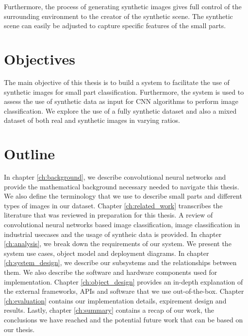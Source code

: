 Furthermore, the process of generating synthetic images gives full control of the surrounding environment to the creator of the synthetic scene. The synthetic scene can easily be adjusted to capture specific features of the small parts.

\section{Objectives}

The main objective of this thesis is to build a system to facilitate the use of synthetic images for small part classification. Furthermore, the system is used to assess the use of synthetic data as input for CNN algorithms to perform image classification. We explore the use of a fully synthetic dataset and also a mixed dataset of both real and synthetic images in varying ratios.

\section{Outline}
In chapter \ref{ch:background}, we describe convolutional neural networks and provide the mathematical background necessary needed to navigate this thesis. We also define the terminology that we use to describe small parts and different types of images in our dataset. Chapter \ref{ch:related_work} transcribes the literature that was reviewed in preparation for this thesis. A review of convolutional neural networks based image classification, image classification in industrial usecases and the usage of syntheic data is provided. In chapter \ref{ch:analysis}, we break down the requirements of our system. We present the system use cases, object model and deployment diagrams. In chapter \ref{ch:system_design}, we describe our subsystems and the relationships between them. We also describe the software and hardware components used for implementation. Chapter \ref{ch:object_design} provides an in-depth explanation of the external frameworks, APIs and software that we use out-of-the-box. Chapter \ref{ch:evaluation} contains our implementation details, expirement design and results. Lastly, chapter \ref{ch:summary} contains a recap of our work, the conclusions we have reached and the potential future work that can be based on our thesis.






